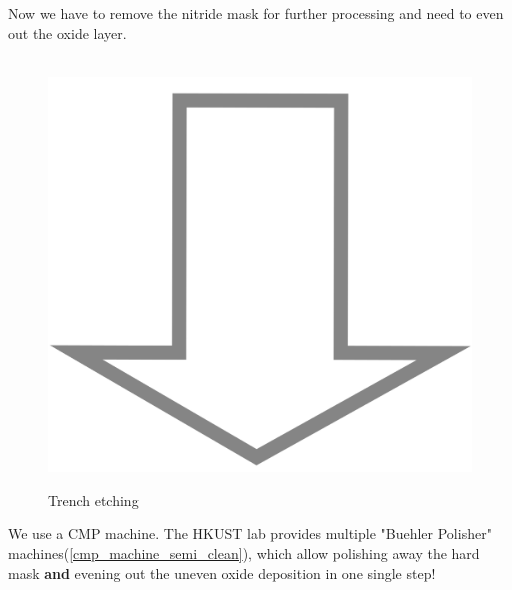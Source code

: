 Now we have to remove the nitride mask for further processing and need to even out the oxide layer.

\begin{figure}[H]
	\centering
	\begin{tikzpicture}[node distance = 3cm, auto, thick,scale=\CrossSectionOnly, every node/.style={transform shape}]
		
	\end{tikzpicture} \\
	\includegraphics[scale=0.01]{down_arrow.png} \\
	\begin{tikzpicture}[node distance = 3cm, auto, thick,scale=\CrossSectionOnly, every node/.style={transform shape}]
		
	\end{tikzpicture}
	\caption{Trench etching}
\end{figure}

We use a CMP machine.
The HKUST lab provides multiple "Buehler Polisher" machines(\autoref{cmp_machine_semi_clean}), which allow polishing away the hard mask \textbf{and} evening out the uneven oxide deposition in one single step!
